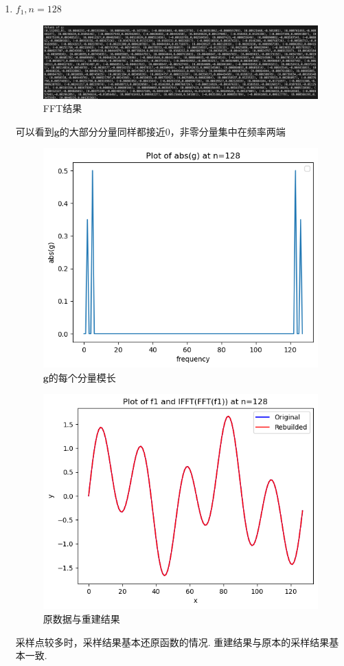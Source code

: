 \documentclass[UTF8]{ctexart}
\begin{document}
\begin{enumerate}
  \item $f_1, n=128$
\begin{figure}[H]
    \centering
    \includegraphics[scale=0.3]{g_2.png}
    \caption{FFT结果}
\end{figure}
可以看到$\mathbf{g}$的大部分分量同样都接近0，非零分量集中在频率两端
\begin{figure}[H]
  \centering
  \includegraphics[scale=0.5]{g_abs_2.png}
  \caption{$\mathbf{g}$的每个分量模长}
\end{figure}
\begin{figure}[H]
  \centering
  \includegraphics[scale=0.5]{res_2.png}
  \caption{原数据与重建结果}
\end{figure}
采样点较多时，采样结果基本还原函数的情况. 重建结果与原本的采样结果基本一致.


\end{enumerate}
\end{document}
